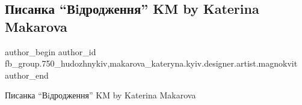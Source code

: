  
 
 
 
 

\subsection{Писанка \enquote{Вiдродження} KM by Katerina Makarova}
\label{sec:01_04_2017.fb.fb_group.750_hudozhnykiv.1.pysanka_vidrozhenjja_by_katerina_makarova}
 
\ifcmt
 author_begin
   author_id fb_group.750_hudozhnykiv,makarova_kateryna.kyiv.designer.artist.magnokvit
 author_end
\fi

Писанка \enquote{Вiдродження} KM by Katerina Makarova
